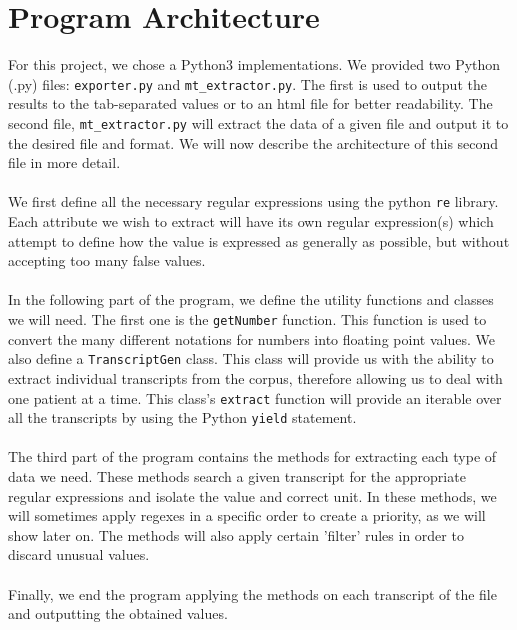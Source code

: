 \documentclass[10pt, a4paper, oneside]{article} %
\begin{document}
\section{Program Architecture}
For this project, we chose a Python3 implementations. We provided two Python (.py) files: \texttt{exporter.py} and \texttt{mt\_extractor.py}. The first is used to output the results to the tab-separated values or to an html file for better readability. The second file, \texttt{mt\_extractor.py} will extract the data of a given file and output it to the desired file and format. We will now describe the architecture of this second file in more detail. \\
\\
We first define all the necessary regular expressions using the python \texttt{re} library. Each attribute we wish to extract will have its own regular expression(s) which attempt to define how the value is expressed as generally as possible, but without accepting too many false values.\\
\\
In the following part of the program, we define the utility functions and classes we will need. The first one is the \texttt{getNumber} function. This function is used to convert the many different notations for numbers into floating point values. We also define a \texttt{TranscriptGen} class. This class will provide us with the ability to extract individual transcripts from the corpus, therefore allowing us to deal with one patient at a time. This class's \texttt{extract} function will provide an iterable over all the transcripts by using the Python \texttt{yield} statement.\\
\\
The third part of the program contains the methods for extracting each type of data we need. These methods search a given transcript for the appropriate regular expressions and isolate the value and correct unit. In these methods, we will sometimes apply regexes in a specific order to create a priority, as we will show later on. The methods will also apply certain 'filter' rules in order to discard unusual values.\\
\\
Finally, we end the program applying the methods on each transcript of the file and outputting the obtained values.
\end{document}
